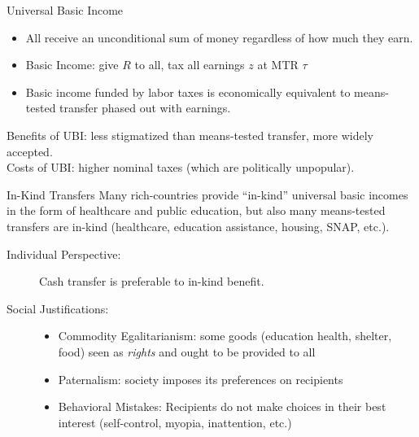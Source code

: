 \documentclass[10pt]{extarticle}
\begin{document}
  \begin{problem}{Universal Basic Income}
    \begin{itemize}
      \item All receive an unconditional sum of money regardless of how much they earn.
      \item Basic Income: give $R$ to all, tax all earnings $z$ at MTR $\tau$
      \item Basic income funded by labor taxes is economically equivalent to means-tested transfer phased out with earnings.
    \end{itemize}
    Benefits of UBI: less stigmatized than means-tested transfer, more widely accepted.\\

    Costs of UBI: higher nominal taxes (which are politically unpopular).
  \end{problem}
  \begin{problem}{In-Kind Transfers}
    Many rich-countries provide ``in-kind'' universal basic incomes in the form of healthcare and public education, but also many means-tested transfers are in-kind (healthcare, education assistance, housing, SNAP, etc.).
    \begin{description}
      \item[Individual Perspective:] Cash transfer is preferable to in-kind benefit.
      \item[Social Justifications:]
        \begin{itemize}
          \item Commodity Egalitarianism: some goods (education health, shelter, food) seen as \textit{rights} and ought to be provided to all
          \item Paternalism: society imposes its preferences on recipients
          \item Behavioral Mistakes: Recipients do not make choices in their best interest (self-control, myopia, inattention, etc.)
        \end{itemize}
    \end{description}
  \end{problem}
\end{document}
